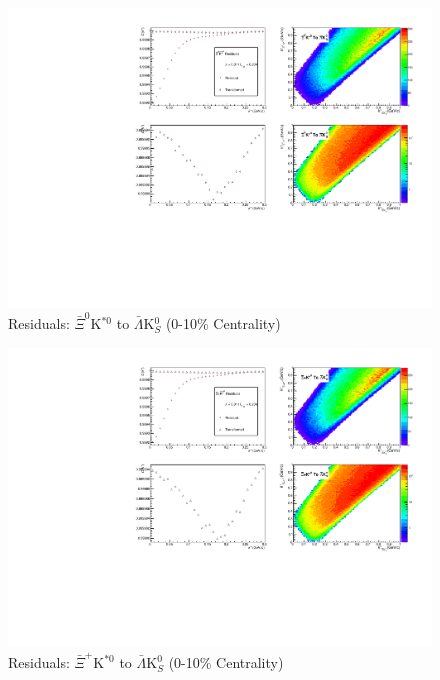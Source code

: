 \documentclass[../AnalysisNoteJBuxton.tex]{subfiles}
\begin{document}
\begin{figure}[h]
  \centering
  \includegraphics[width=\textwidth]{9_AdditionalFigures/Figures/Residuals/ALamK0/Residuals_ALamK0_0010_AXi0KSt0ToALamK0_MomResCrctn_NonFlatBgdCrctn_SingleLamParam_ResidualsIncluded_UsingCoulombOnlyInterpCfs.pdf}
  \caption[Residuals: $\bar{\Xi}^{0}$K$^{*0}$ to $\bar{\Lambda}$K$^{0}_{S}$ (0-10\% Centrality)]{Residuals: $\bar{\Xi}^{0}$K$^{*0}$ to $\bar{\Lambda}$K$^{0}_{S}$ (0-10\% Centrality)}
  \label{fig:Res_ALamK0_0010_AXi0KSt0}
\end{figure}

\begin{figure}[h]
  \centering
  \includegraphics[width=\textwidth]{9_AdditionalFigures/Figures/Residuals/ALamK0/Residuals_ALamK0_0010_AXiKSt0ToALamK0_MomResCrctn_NonFlatBgdCrctn_SingleLamParam_ResidualsIncluded_UsingCoulombOnlyInterpCfs.pdf}
  \caption[Residuals: $\bar{\Xi}^{+}$K$^{*0}$ to $\bar{\Lambda}$K$^{0}_{S}$ (0-10\% Centrality)]{Residuals: $\bar{\Xi}^{+}$K$^{*0}$ to $\bar{\Lambda}$K$^{0}_{S}$ (0-10\% Centrality)}
  \label{fig:Res_ALamK0_0010_AXiCKSt0}
\end{figure}
\end{document}
